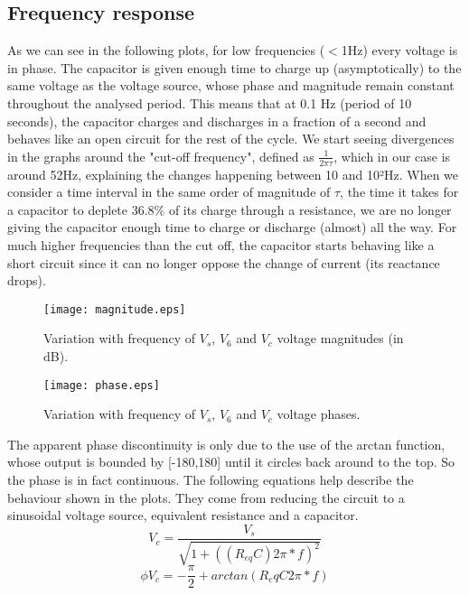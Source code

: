 \subsection{Frequency response}
As we can see in the following plots, for low frequencies ($<$1Hz) every voltage is in phase. The capacitor is given enough time to charge up (asymptotically) to the same voltage as the voltage source, whose phase and magnitude remain constant throughout the analysed period. This means that at 0.1 Hz (period of 10 seconds), the capacitor charges and discharges in a fraction of a second and behaves like an open circuit for the rest of the cycle. We start seeing divergences in the graphs around the "cut-off frequency", defined as $\frac{1}{2\pi\tau}$, which in our case is around 52Hz, explaining the changes happening between 10 and 10²Hz. When we consider a time interval in the same order of magnitude of $\tau$, the time it takes for a capacitor to deplete 36.8\% of its charge through a resistance, we are no longer giving the capacitor enough time to charge or discharge (almost) all the way. For much higher frequencies than the cut off, the capacitor starts behaving like a short circuit since it can no longer oppose the change of current (its reactance drops).
\begin{figure}[!h] 
	\centering
\begin{minipage}[b]{0.65\linewidth}	
	\texttt{[image: magnitude.eps]}
\caption{Variation with frequency of $V_{s}$, $V_{6}$ and $V_{c}$ voltage magnitudes (in dB).}
\end{minipage}
\hfill
\begin{minipage}[b]{0.65\linewidth}
\texttt{[image: phase.eps]}
\caption{Variation with frequency of $V_{s}$, $V_{6}$ and $V_{c}$ voltage phases.}
\end{minipage}
\end{figure}
The apparent phase discontinuity is only due to the use of the arctan function, whose output is bounded by [-180,180] until it circles back around to the top. So the phase is in fact continuous.
The following equations help describe the behaviour shown in the plots. They come from reducing the circuit to a sinusoidal voltage source, equivalent resistance and a capacitor.
\begin{equation}
V_c=\frac{V_s}{\sqrt{1+((R_{eq}C)2\pi*f)^2}}
\end{equation}
\begin{equation}
\phi V_c=-\frac{\pi}{2}+arctan(R_eqC2\pi*f)
\end{equation}
